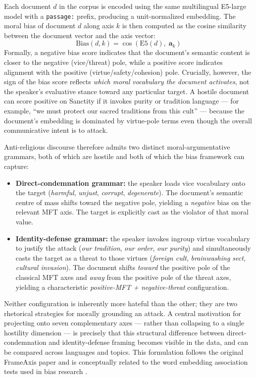 \documentclass[../CLthesis.tex]{subfiles}
\begin{document}
Each document $d$ in the corpus is encoded using the same multilingual E5-large model with a \texttt{passage:} prefix, producing a unit-normalized embedding. The moral bias of document $d$ along axis $k$ is then computed as the cosine similarity between the document vector and the axis vector:
\begin{equation}
    \text{Bias}(d, k) = \cos\!\left(\text{E5}(d),\; \mathbf{a}_k\right)
\end{equation}
Formally, a negative bias score indicates that the document's semantic content is closer to the negative (vice/threat) pole, while a positive score indicates alignment with the positive (virtue/safety/cohesion) pole. Crucially, however, the sign of the bias score reflects \emph{which moral vocabulary the document activates}, not the speaker's evaluative stance toward any particular target. A hostile document can score positive on Sanctity if it invokes purity or tradition language — for example, ``we must protect our sacred traditions from this cult'' — because the document's embedding is dominated by virtue-pole terms even though the overall communicative intent is to attack.

Anti-religious discourse therefore admits two distinct moral-argumentative grammars, both of which are hostile and both of which the bias framework can capture:
\begin{itemize}
    \item \textbf{Direct-condemnation grammar:} the speaker loads vice vocabulary onto the target (\textit{harmful}, \textit{unjust}, \textit{corrupt}, \textit{degenerate}). The document's semantic centre of mass shifts toward the negative pole, yielding a \emph{negative} bias on the relevant MFT axis. The target is explicitly cast as the violator of that moral value.
    \item \textbf{Identity-defense grammar:} the speaker invokes ingroup virtue vocabulary to justify the attack (\textit{our tradition}, \textit{our order}, \textit{our purity}) and simultaneously casts the target as a threat to those virtues (\textit{foreign cult}, \textit{brainwashing sect}, \textit{cultural invasion}). The document shifts \emph{toward} the positive pole of the classical MFT axes and \emph{away} from the positive pole of the threat axes, yielding a characteristic \emph{positive-MFT + negative-threat} configuration.
\end{itemize}
Neither configuration is inherently more hateful than the other; they are two rhetorical strategies for morally grounding an attack. A central motivation for projecting onto seven complementary axes — rather than collapsing to a single hostility dimension — is precisely that this structural difference between direct-condemnation and identity-defense framing becomes visible in the data, and can be compared across languages and topics. This formulation follows the original FrameAxis paper \citep{Kwak_2021} and is conceptually related to the word embedding association tests used in bias research \citep{Caliskan_2017}.
\end{document}
